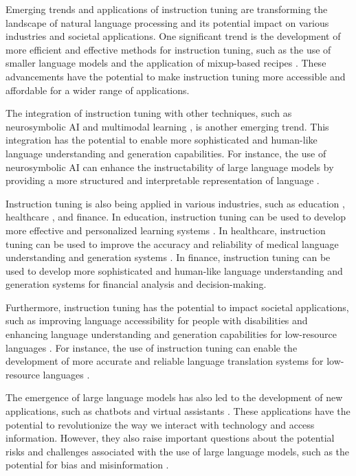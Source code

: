 \documentclass[11pt]{article}
\begin{document}
Emerging trends and applications of instruction tuning are transforming the landscape of natural language processing and its potential impact on various industries and societal applications. One significant trend is the development of more efficient and effective methods for instruction tuning, such as the use of smaller language models \cite{ref135} and the application of mixup-based recipes \cite{ref30}. These advancements have the potential to make instruction tuning more accessible and affordable for a wider range of applications.

The integration of instruction tuning with other techniques, such as neurosymbolic AI \cite{ref136} and multimodal learning \cite{ref17}, is another emerging trend. This integration has the potential to enable more sophisticated and human-like language understanding and generation capabilities. For instance, the use of neurosymbolic AI can enhance the instructability of large language models by providing a more structured and interpretable representation of language \cite{ref136}.

Instruction tuning is also being applied in various industries, such as education \cite{ref137}, healthcare \cite{ref128}, and finance. In education, instruction tuning can be used to develop more effective and personalized learning systems \cite{ref137}. In healthcare, instruction tuning can be used to improve the accuracy and reliability of medical language understanding and generation systems \cite{ref128}. In finance, instruction tuning can be used to develop more sophisticated and human-like language understanding and generation systems for financial analysis and decision-making.

Furthermore, instruction tuning has the potential to impact societal applications, such as improving language accessibility for people with disabilities \cite{ref138} and enhancing language understanding and generation capabilities for low-resource languages \cite{ref17}. For instance, the use of instruction tuning can enable the development of more accurate and reliable language translation systems for low-resource languages \cite{ref17}.

The emergence of large language models has also led to the development of new applications, such as chatbots and virtual assistants \cite{ref139}. These applications have the potential to revolutionize the way we interact with technology and access information. However, they also raise important questions about the potential risks and challenges associated with the use of large language models, such as the potential for bias and misinformation \cite{ref96}.
\end{document}
